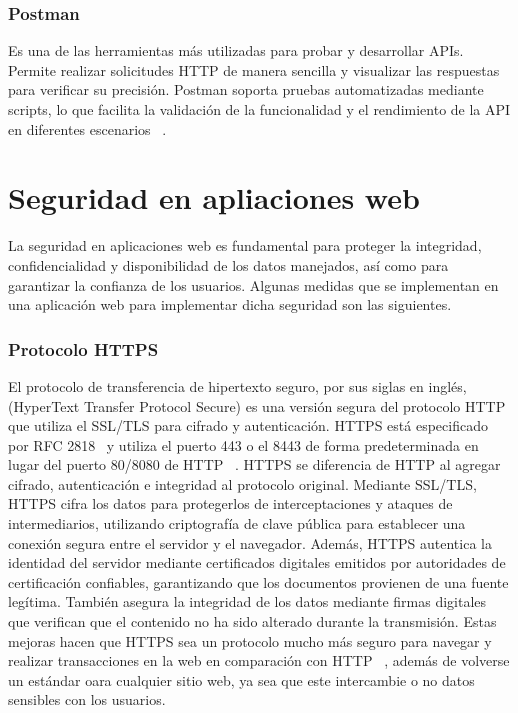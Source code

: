 \subsubsection{Postman}
Es una de las herramientas más utilizadas para probar y desarrollar APIs. Permite realizar solicitudes HTTP de manera sencilla y visualizar las respuestas para verificar su precisión. Postman soporta pruebas automatizadas mediante scripts, lo que facilita la validación de la funcionalidad y el rendimiento de la API en diferentes escenarios ~\cite{Postman-QAlified}. 


\section{Seguridad en apliaciones web}
La seguridad en aplicaciones web es fundamental para proteger la integridad, confidencialidad y disponibilidad de los datos manejados, así como para garantizar la confianza de los usuarios. Algunas medidas que se implementan en una aplicación web para implementar dicha seguridad son las siguientes.

\subsubsection{Protocolo HTTPS}
El protocolo de transferencia de hipertexto seguro, por sus siglas en inglés, (HyperText Transfer Protocol Secure) es una versión segura del protocolo HTTP que utiliza el SSL\slash TLS para cifrado y autenticación. HTTPS está especificado por RFC 2818~\cite{RFC2818} y utiliza el puerto 443 o el 8443 de forma predeterminada en lugar del puerto 80/8080 de HTTP ~\cite{HTTPS-SSL}. \newline
HTTPS se diferencia de HTTP al agregar cifrado, autenticación e integridad al protocolo original. Mediante SSL/TLS, HTTPS cifra los datos para protegerlos de interceptaciones y ataques de intermediarios, utilizando criptografía de clave pública para establecer una conexión segura entre el servidor y el navegador. Además, HTTPS autentica la identidad del servidor mediante certificados digitales emitidos por autoridades de certificación confiables, garantizando que los documentos provienen de una fuente legítima. También asegura la integridad de los datos mediante firmas digitales que verifican que el contenido no ha sido alterado durante la transmisión. Estas mejoras hacen que HTTPS sea un protocolo mucho más seguro para navegar y realizar transacciones en la web en comparación con HTTP ~\cite{HTTPS-SSL}, además de volverse un estándar oara cualquier sitio web, ya sea que este intercambie o no datos sensibles con los usuarios.

